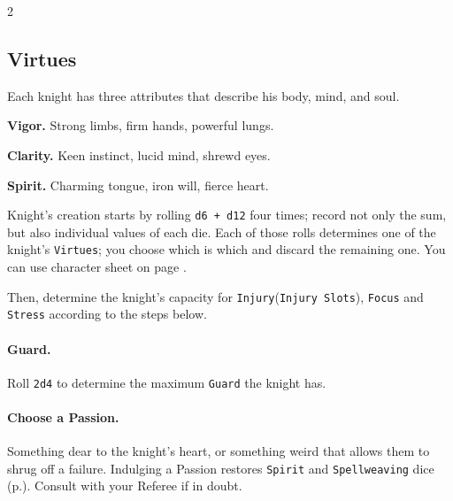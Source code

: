 \documentclass{osr-template/zine}
\begin{document}
\begin{multicols*}{2}


\subsection*{Virtues}

Each knight has three attributes that describe his body, mind, and soul.

\textbf{Vigor.}
Strong limbs, firm hands, powerful lungs.

\textbf{Clarity.}
Keen instinct, lucid mind, shrewd eyes.

\textbf{Spirit.}
Charming tongue, iron will, fierce heart.

Knight's creation starts by rolling \texttt{d6 + d12} four times; record not only the sum, but also individual values of each die.
Each of those rolls determines one of the knight's \texttt{Virtues}; you choose which is which and discard the remaining one. You can use character sheet on page \pageref*{sec:ch_sheet}.

Then, determine the knight's capacity for \texttt{Injury}(\texttt{Injury Slots}), \texttt{Focus} and \texttt{Stress} according to the steps below.

\paragraph{Guard.} Roll \texttt{2d4} to determine the maximum \texttt{Guard} the knight has.

\paragraph{Choose a Passion. } Something dear to the knight's heart, or something weird that allows them to shrug off a failure.
Indulging a Passion restores \texttt{Spirit} and \texttt{Spellweaving} dice (p.\pageref*{sec:spellweaving}). Consult with your Referee if in doubt.


\end{multicols*}
\end{document}
